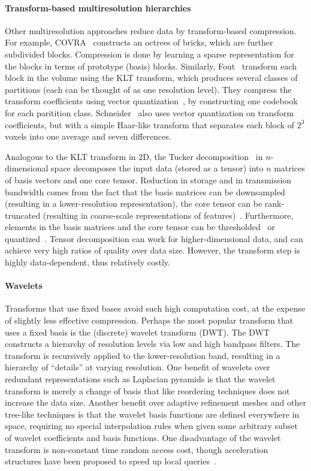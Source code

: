 \paragraph{\textbf{Transform-based multiresolution hierarchies}}
Other multiresolution approaches reduce data by transform-based compression. For example,
COVRA~\cite{covra2012} constructs an octrees of bricks, which are further subdivided blocks.
Compression is done by learning a sparse representation for the blocks in terms of prototype (basis)
blocks. Similarly, Fout\etal~\cite{hw_dvr2007} transform each block in the volume using the KLT
transform, which produces several classes of partitions (each can be thought of as one resolution
level). They compress the transform coefficients using vector quantization~\cite{vq1992}, by
constructing one codebook for each paritition class. Schneider\etal~\cite{compression_domain2003}
also uses vector quantization on transform coefficients, but with a simple Haar-like transform that
separates each block of $2^3$ voxels into one average and seven differences.

Analogous to the KLT transform in 2D, the Tucker decomposition~\cite{tensor_dvr2015} in
$n$-dimensional space decomposes the input data (stored as a tensor) into $n$ matrices of basis
vectors and one core tensor. Reduction in storage and in transmission bandwidth comes from the fact
that the basis matrices can be downsampled (resulting in a lower-resolution representation), the
core tensor can be rank-truncated (resulting in coarse-scale representations of
features)~\cite{tamresh,tucker-thresholding,multiscale-tensor}. Furthermore, elements in the basis
matrices and the core tensor can be thresholded~\cite{tucker-thresholding} or
quantized~\cite{tamresh,multiscale-tensor}. Tensor decomposition can work for higher-dimensional
data, and can achieve very high ratios of quality over data size. However, the transform step is
highly data-dependent, thus relatively costly.

\paragraph{\textbf{Wavelets}}
Transforms that use fixed bases avoid such high computation cost, at the expense of slightly less
effective compression. Perhaps the most popular transform that uses a fixed basis is the (discrete)
wavelet transform (DWT). The DWT constructs a hierarchy of resolution levels via low and high
bandpass filters. The transform is recursively applied to the lower-resolution band, resulting in a
hierarchy of ``details'' at varying resolution. One benefit of wavelets over redundant
representations such as Laplacian pyramids is that the wavelet transform is merely a change of basis
that like reordering techniques does not increase the data size. Another benefit over adaptive
refinement meshes and other tree-like techniques is that the wavelet basis functions are defined
everywhere in space, requiring no special interpolation rules when given some arbitrary subset of
wavelet coefficients and basis functions. One disadvantage of the wavelet transform is non-constant
time random access cost, though acceleration structures have been proposed to speed up local
queries~\cite{weiss}.

